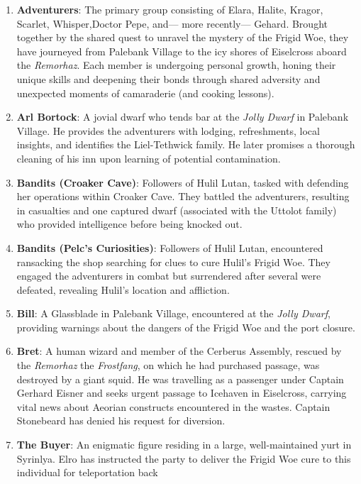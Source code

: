 \documentclass[
  letterpaper,12pt,twoside,twocolumn,openany,
  nodeprecatedcode,bg=full]{dndbook}
\begin{document}
\begin{enumerate}
\def\labelenumi{\arabic{enumi}.}
\item
  \textbf{Adventurers}: The primary group consisting of Elara, Halite,
  Kragor, Scarlet, Whisper,Doctor Pepe, and--- more recently--- Gehard.
  Brought together by the shared quest to unravel the mystery of the
  Frigid Woe, they have journeyed from Palebank Village to the icy
  shores of Eiselcross aboard the \emph{Remorhaz}. Each member is
  undergoing personal growth, honing their unique skills and deepening
  their bonds through shared adversity and unexpected moments of
  camaraderie (and cooking lessons).
\item
  \textbf{Arl Bortock}: A jovial dwarf who tends bar at the \emph{Jolly
  Dwarf} in Palebank Village. He provides the adventurers with lodging,
  refreshments, local insights, and identifies the Liel-Tethwick family.
  He later promises a thorough cleaning of his inn upon learning of
  potential contamination.
\item
  \textbf{Bandits (Croaker Cave)}: Followers of Hulil Lutan, tasked with
  defending her operations within Croaker Cave. They battled the
  adventurers, resulting in casualties and one captured dwarf
  (associated with the Uttolot family) who provided intelligence before
  being knocked out.
\item
  \textbf{Bandits (Pelc's Curiosities)}: Followers of Hulil Lutan,
  encountered ransacking the shop searching for clues to cure Hulil's
  Frigid Woe. They engaged the adventurers in combat but surrendered
  after several were defeated, revealing Hulil's location and
  affliction.
\item
  \textbf{Bill}: A Glassblade in Palebank Village, encountered at the
  \emph{Jolly Dwarf}, providing warnings about the dangers of the Frigid
  Woe and the port closure.
\item
  \textbf{Bret}: A human wizard and member of the Cerberus Assembly,
  rescued by the \emph{Remorhaz} the \emph{Frostfang}, on which he had
  purchased passage, was destroyed by a giant squid. He was travelling
  as a passenger under Captain Gerhard Eisner and seeks urgent passage
  to Icehaven in Eiselcross, carrying vital news about Aeorian
  constructs encountered in the wastes. Captain Stonebeard has denied
  his request for diversion.
\item
  \textbf{The Buyer}: An enigmatic figure residing in a large,
  well-maintained yurt in Syrinlya. Elro has instructed the party to
  deliver the Frigid Woe cure to this individual for teleportation back

\end{enumerate}
\end{document}
